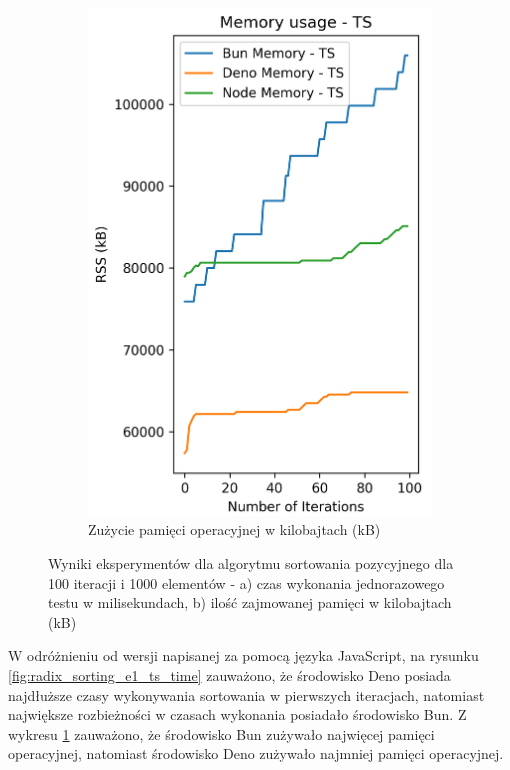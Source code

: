 \begin{figure}[H]
\begin{subfigure}[b]{0.42\textwidth}
  \end{subfigure}
  \begin{subfigure}[b]{0.42\textwidth}
    \centering
    \includegraphics[width=\textwidth]{Figures/sorting/sorting_radix_100_1000_ts_memory.png}
    \caption{Zużycie pamięci operacyjnej w kilobajtach (kB)}
    \label{fig:radix_sorting_e1_ts_memory}
  \end{subfigure}
  \caption{Wyniki eksperymentów dla algorytmu sortowania pozycyjnego dla 100 iteracji i 1000 elementów - a) czas wykonania jednorazowego testu w milisekundach, b) ilość zajmowanej pamięci w kilobajtach (kB)}
  \label{fig:radix_sorting_e1_ts}
\end{figure}

W odróżnieniu od wersji napisanej za pomocą języka JavaScript, na rysunku \ref{fig:radix_sorting_e1_ts_time} zauważono, że środowisko Deno posiada najdłuższe czasy wykonywania sortowania w pierwszych iteracjach, natomiast największe rozbieżności w czasach wykonania posiadało środowisko Bun. Z wykresu \ref{fig:radix_sorting_e1_ts_memory} zauważono, że środowisko Bun zużywało najwięcej pamięci operacyjnej, natomiast środowisko Deno zużywało najmniej pamięci operacyjnej.

